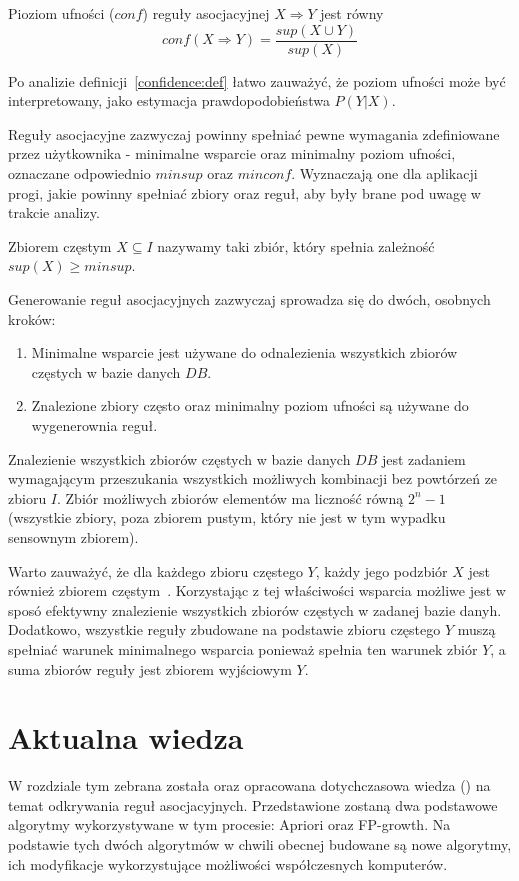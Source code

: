 \begin{df}\label{confidence:def}
Pioziom ufności ($conf$) reguły asocjacyjnej $X \Rightarrow Y$ jest równy 
\begin{equation}
	conf(X \Rightarrow Y) = \frac{sup(X \cup Y)}{sup(X)}
\end{equation}
\end{df}

Po analizie definicji~\ref{confidence:def} łatwo zauważyć, że poziom ufności może być interpretowany, jako estymacja prawdopodobieństwa $P(Y | X)$.

Reguły asocjacyjne zazwyczaj powinny spełniać pewne wymagania zdefiniowane przez użytkownika - minimalne wsparcie oraz minimalny poziom ufności, oznaczane odpowiednio $minsup$ oraz $minconf$. Wyznaczają one dla aplikacji progi, jakie powinny spełniać zbiory oraz reguł, aby były brane pod uwagę w trakcie analizy.

\begin{df}
Zbiorem częstym $X \subseteq I$ nazywamy taki zbiór, który spełnia zależność $sup(X) \geq minsup$.
\end{df}

Generowanie reguł asocjacyjnych zazwyczaj sprowadza się do dwóch, osobnych kroków:
\begin{enumerate}
	\item Minimalne wsparcie jest używane do odnalezienia wszystkich zbiorów częstych w bazie danych $DB$.
	\item Znalezione zbiory często oraz minimalny poziom ufności są używane do wygenerownia reguł.
\end{enumerate}

Znalezienie wszystkich zbiorów częstych w bazie danych $DB$ jest zadaniem wymagającym przeszukania wszystkich możliwych kombinacji bez powtórzeń ze zbioru $I$. Zbiór możliwych zbiorów elementów ma liczność równą $2^n - 1$ (wszystkie zbiory, poza zbiorem pustym, który nie jest w tym wypadku sensownym zbiorem). 

Warto zauważyć, że dla każdego zbioru częstego $Y$, każdy jego podzbiór $X$ jest również zbiorem częstym~\cite{Problem:Statement}. Korzystając z tej właściwości wsparcia możliwe jest w sposó efektywny znalezienie wszystkich zbiorów częstych w zadanej bazie danyh. Dodatkowo, wszystkie reguły zbudowane na podstawie zbioru częstego $Y$ muszą spełniać warunek minimalnego wsparcia ponieważ spełnia ten warunek zbiór $Y$, a suma zbiorów reguły jest zbiorem wyjściowym $Y$.

\section{Aktualna wiedza}
W rozdziale tym zebrana została oraz opracowana dotychczasowa wiedza () na temat odkrywania reguł asocjacyjnych. Przedstawione zostaną dwa podstawowe algorytmy wykorzystywane w tym procesie: Apriori oraz FP-growth. Na podstawie tych dwóch algorytmów w chwili obecnej budowane są nowe algorytmy, ich modyfikacje wykorzystujące możliwości współczesnych komputerów.

